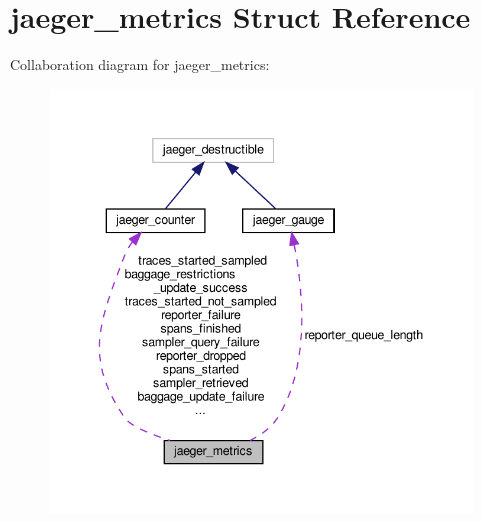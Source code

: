 \hypertarget{structjaeger__metrics}{}\section{jaeger\+\_\+metrics Struct Reference}
\label{structjaeger__metrics}


Collaboration diagram for jaeger\+\_\+metrics\+:\nopagebreak
\begin{figure}[H]
\begin{center}
\leavevmode
\includegraphics[width=344pt]{structjaeger__metrics__coll__graph}
\end{center}
\end{figure}
